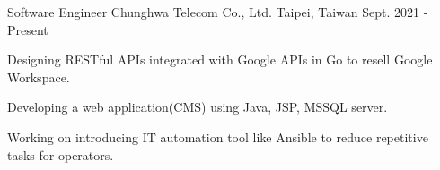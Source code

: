 

\begin{cventries}

  \cventry
    {Software Engineer} %
    {Chunghwa Telecom Co., Ltd.} %
    {Taipei, Taiwan} %
    {Sept. 2021 - Present} %
    {
      \begin{cvitems} %
        \item {Designing RESTful APIs integrated with Google APIs in Go to resell Google Workspace.}
        \item {Developing a web application(CMS) using Java, JSP, MSSQL server.}
        \item {Working on introducing IT automation tool like Ansible to reduce repetitive tasks for operators.}
      \end{cvitems}
    }


\end{cventries}
